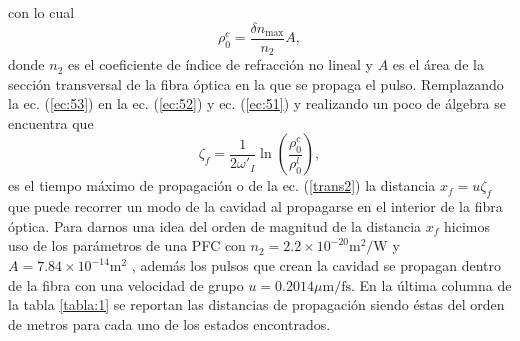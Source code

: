 con lo cual
\begin{equation}
\rho_0^c=\frac{\delta n_{\text{max}}}{n_2}A,
\end{equation}\label{ec:53}
donde $n_2$ es el coeficiente de \'{i}ndice de refracci\'{o}n no lineal y $A$ es el \'{a}rea de la secci\'{o}n transversal de la fibra \'{o}ptica en la que se propaga el pulso. Remplazando la ec. (\ref{ec:53}) en la ec. (\ref{ec:52}) y  ec. (\ref{ec:51}) y realizando un poco de \'{a}lgebra se encuentra que
\begin{equation}
\zeta_f=\frac{1}{2\omega'_{I}}\ln\left(\frac{\rho_0^c}{\rho_0^l}\right),
\end{equation}
es el tiempo m\'{a}ximo de propagaci\'{o}n o de la ec. (\ref{trans2}) la distancia $x_f=u\zeta_f$ que puede recorrer un modo de la cavidad al propagarse en el interior de la fibra \'{o}ptica.  Para darnos una idea del orden de magnitud de la distancia $x_f$ hicimos uso de los par\'{a}metros de una PFC con $n_2=2.2\times10^{-20}\text{m}^2/\text{W}$ \citep{Agrawal2013} y $A=7.84\times10^{-14} \text{m}^2$ \citep{Bermudez2016jp}, adem\'{a}s los pulsos que crean la cavidad se propagan dentro de la fibra con una velocidad de grupo $u=0.2014\mu \text{m}/\text{fs}$. En la \'{u}ltima columna de la tabla \ref{tabla:1} se reportan las distancias de propagaci\'{o}n siendo \'{e}stas del orden de metros para cada uno de los estados encontrados.
\\